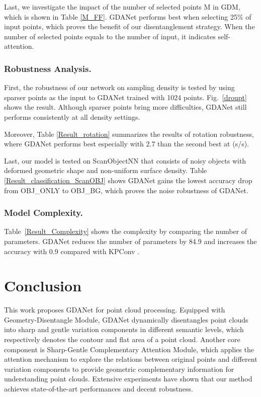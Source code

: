 \documentclass[letterpaper]{article} \usepackage{aaai21}  \usepackage{times}  \usepackage{helvet} \usepackage{courier}  \usepackage[hyphens]{url}  \usepackage{graphicx} \urlstyle{rm} \def\UrlFont{\rm}  \usepackage{natbib}  \usepackage{caption} \frenchspacing  \setlength{\pdfpagewidth}{8.5in}  \setlength{\pdfpageheight}{11in}  \usepackage{color}
\begin{document}
Last, we investigate the impact of the number of selected points M in GDM, which is shown in Table \ref{M_FF}. GDANet performs best when selecting 25\% of input points, which proves the benefit of our disentanglement strategy. When the number of selected points equals to the number of input, it indicates self-attention. 

\subsubsection{Robustness Analysis.}
First, the robustness of our network on sampling density is tested by using sparser points as the input to GDANet trained with 1024 points.
Fig.~\ref{droupt} shows the result. Although sparser points bring more difficulties, GDANet still performs consistently at all density settings.

Moreover, Table \ref{Result_rotation} summarizes the results of rotation robustness, where GDANet performs best especially with 2.7 than the second best at (s/s).









Last, our model is tested on ScanObjectNN \cite{Uy_2019_ICCVnew} that consists of noisy objects with deformed geometric shape and non-uniform surface density. Table \ref{Result_classification_ScanOBJ} shows GDANet gains the lowest accuracy drop from OBJ\_ONLY to OBJ\_BG, which proves the noise robustness of GDANet. 

\subsubsection{Model Complexity.}
Table~\ref{Result_Complexity} shows the complexity by comparing the number of parameters. GDANet reduces the number of parameters by 84.9 and increases the accuracy with 0.9 compared with KPConv \cite{thomas2019KPConv}. 

\section{Conclusion}
This work proposes GDANet for point cloud processing. Equipped with Geometry-Disentangle Module, GDANet dynamically disentangles point clouds into sharp and gentle variation components in different semantic levels, which respectively denotes the contour and flat area of a point cloud. Another core component is Sharp-Gentle Complementary Attention Module, which applies the attention mechanism to explore the relations between original points and different variation components to provide geometric complementary information for understanding point clouds. Extensive experiments have shown that our method achieves state-of-the-art performances and decent robustness.
\end{document}

